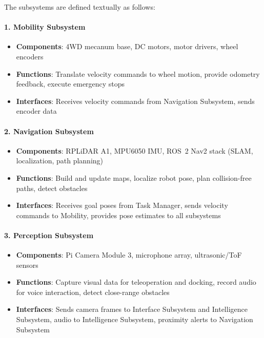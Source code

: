 The subsystems are defined textually as follows:

\paragraph{1. Mobility Subsystem}
\begin{itemize}
    \item \textbf{Components}: 4WD mecanum base, DC motors, motor drivers, wheel encoders
    \item \textbf{Functions}: Translate velocity commands to wheel motion, provide odometry feedback, execute emergency stops
    \item \textbf{Interfaces}: Receives velocity commands from Navigation Subsystem, sends encoder data
\end{itemize}

\paragraph{2. Navigation Subsystem}
\begin{itemize}
    \item \textbf{Components}: RPLiDAR A1, MPU6050 IMU, ROS~2 Nav2 stack (SLAM, localization, path planning)
    \item \textbf{Functions}: Build and update maps, localize robot pose, plan collision-free paths, detect obstacles
    \item \textbf{Interfaces}: Receives goal poses from Task Manager, sends velocity commands to Mobility, provides pose estimates to all subsystems
\end{itemize}

\paragraph{3. Perception Subsystem}
\begin{itemize}
    \item \textbf{Components}: Pi Camera Module 3, microphone array, ultrasonic/ToF sensors
    \item \textbf{Functions}: Capture visual data for teleoperation and docking, record audio for voice interaction, detect close-range obstacles
    \item \textbf{Interfaces}: Sends camera frames to Interface Subsystem and Intelligence Subsystem, audio to Intelligence Subsystem, proximity alerts to Navigation Subsystem
\end{itemize}

